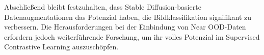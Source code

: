 Abschließend bleibt festzuhalten, dass Stable Diffusion-basierte Datenaugmentationen das Potenzial haben, die Bildklassifikation signifikant zu verbessern. Die Herausforderungen bei der Einbindung von Near OOD-Daten erfordern jedoch weiterführende Forschung, um ihr volles Potenzial im Supervised Contrastive Learning auszuschöpfen.